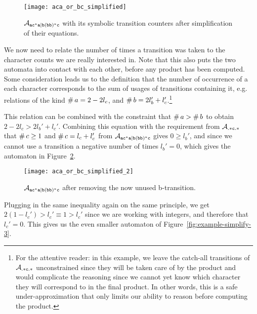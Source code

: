 \documentclass[acmsmall,review,anonymous]{acmart}\settopmatter{printfolios=true,printccs=false,printacmref=true}
\theoremstyle{definition}
\begin{document}
\begin{figure}[h]
  \begin{minipage}[b]{0.75\linewidth}
  \centering 
    \texttt{[image: aca\_or\_bc\_simplified]}
    \caption{$\mathcal{A}_{\mathtt{ac^*a|b(bb)^*c}}{}$ with its symbolic transition counters after
    simplification of their equations.}\label{fig:example-simplify-1}
  \end{minipage}
  \end{figure}

  We now need to relate the number of times a transition was taken to the
  character counts we are really interested in. Note that this also puts the two
  automata into contact with each other, before any product has been computed.
  Some consideration leads us to the definition that the number of occurrence of
  a each character corresponds to the sum of usages of transitions containing
  it, e.g. relations of the kind $\operatorname{\#}{a} = 2 - 2l_c$, and
  $\operatorname{\#}{b} = 2 l_b' + l_c'$.\footnote{For the attentive reader: in this
  example, we leave the catch-all transitions of $\mathcal{A}_{\mathtt{.*c.*}}$
  unconstrained since they will be taken care of by the product and would
  complicate the reasoning since we cannot yet know which character they will
  correspond to in the final product. In other words, this is a safe
  under-approximation that only limits our ability to reason before
  computing the product.}

This relation can be combined with the constraint that $\operatorname{\#}{a} >
\operatorname{\#}{b}$ to obtain $2 - 2l_c > 2 l_b' + l_c'$. Combining this
equation with the requirement from $\mathcal{A}_{\mathtt{.*c.*}}$ that
$\operatorname{\#}{c} \geq 1$ and $\operatorname{\#}{c} = l_c + l_c'$ from
$\mathcal{A}_{\mathtt{ac^*a|b(bb)^*c}}$ gives $0 \geq l_b'$, and since we cannot use a transition a negative
number of times $l_b' = 0$, which gives the automaton in
Figure~\ref{fig:example-simplify-2}.

\begin{figure}[h]
  \begin{minipage}[b]{0.75\linewidth}
  \centering 
    \texttt{[image: aca\_or\_bc\_simplified\_2]}
    \caption{$\mathcal{A}_{\mathtt{ac^*a|b(bb)^*c}}{}$ after removing the now unused b-transition.}\label{fig:example-simplify-2}
  \end{minipage}
  \end{figure}

  Plugging in the same inequality again on the same principle, we get $2(1 -
  l_c') > l_c' \equiv 1 > l_c'$ since we are working with integers, and
  therefore that $l_c' = 0$. This gives us the even smaller automaton of
  Figure~\ref{fig:example-simplify-3}.
\end{document}
